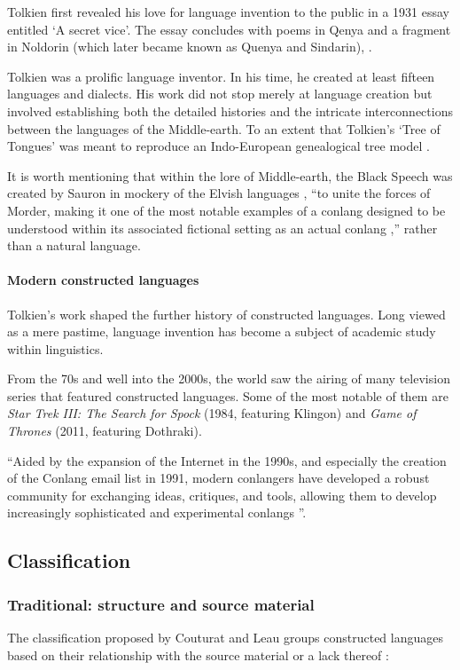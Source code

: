 \documentclass[14pt, a4paper]{extreport}
\begin{document}
Tolkien first revealed his love for language invention to the public in a 1931 essay entitled `A secret vice'. The essay concludes with poems in Qenya and a fragment in Noldorin (which later became known as Quenya and Sindarin), \parencite{tolkien83}.

Tolkien was a prolific language inventor. In his time, he created at least fifteen languages and dialects. His work did not stop merely at language creation but involved establishing both the detailed histories and the intricate interconnections between the languages of the Middle-earth. To an extent that Tolkien's `Tree of Tongues' was meant to reproduce an Indo-European genealogical tree model \parencite[101]{fimi}.

It is worth mentioning that within the lore of Middle-earth, the Black Speech was created by Sauron in mockery of the Elvish languages \parencite[20]{tolkien19}, ``to unite the forces of Morder, making it one of the most notable examples of a conlang designed to be understood within its associated fictional setting as an actual conlang \parencite{sanders},'' rather than a natural language.
        \paragraph{Modern constructed languages}
Tolkien's work shaped the further history of constructed languages. Long viewed as a mere pastime, language invention has become a subject of academic study within linguistics.

From the 70s and well into the 2000s, the world saw the airing of many television series that featured constructed languages. Some of the most notable of them are \textit{Star Trek III: The Search for Spock} (1984, featuring Klingon) and \textit{Game of Thrones} (2011, featuring Dothraki).

``Aided by the expansion of the Internet in the 1990s, and especially the creation of the Conlang email list in 1991, modern conlangers have developed a robust community for exchanging ideas, critiques, and tools, allowing them to develop increasingly sophisticated and experimental conlangs \parencite{sanders}''.
    \subsection{Classification}
      \subsubsection{Traditional: structure and source material}
The classification proposed by Couturat and Leau groups constructed languages based on their relationship with the source material or a lack thereof \parencite{couturat}:
\end{document}
